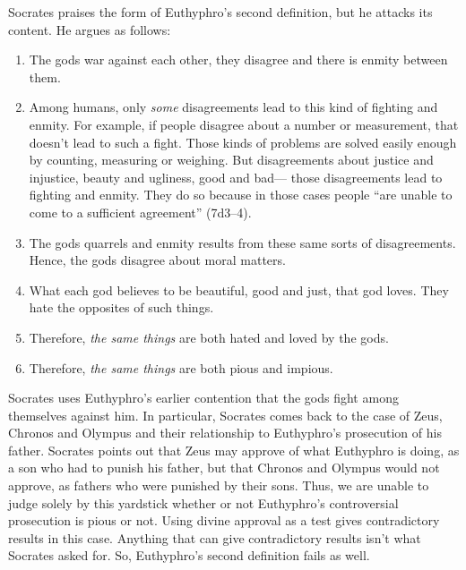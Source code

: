 \documentclass[11pt]{article}
\begin{document}
Socrates praises the form of Euthyphro's second definition, but he attacks
its content.  He argues as follows:

\begin{enumerate}

    \item The gods war against each other, they disagree and there is
        enmity between them.

    \item Among humans, only \emph{some} disagreements lead to this kind of
        fighting and enmity.  For example, if people disagree about
        a number or measurement, that doesn't lead to such a fight.  Those
        kinds of problems are solved easily enough by counting, measuring
        or weighing.  But disagreements about justice and injustice, beauty
        and ugliness, good and bad--- those disagreements lead to fighting
        and enmity.  They do so because in those cases people ``are unable
        to come to a sufficient agreement'' (7d3--4).

    \item The gods quarrels and enmity results from these same sorts of
        disagreements.  Hence, the gods disagree about moral matters.

    \item What each god believes to be beautiful, good and just, that god
        loves.  They hate the opposites of such things.

    \item Therefore, \emph{the same things} are both hated and loved by the
        gods.

    \item Therefore, \emph{the same things} are both pious and impious.

\end{enumerate}


Socrates uses Euthyphro's earlier contention that the gods fight among
themselves against him.  In particular, Socrates comes back to the case of
Zeus, Chronos and Olympus and their relationship to Euthyphro's prosecution
of his father.  Socrates points out that Zeus may approve of what Euthyphro
is doing, as a son who had to punish his father, but that Chronos and
Olympus would not approve, as fathers who were punished by their sons.
Thus, we are unable to judge solely by this yardstick whether or not
Euthyphro's controversial prosecution is pious or not.  Using divine
approval as a test gives contradictory results in this case.  Anything that
can give contradictory results isn't what Socrates asked for.  So,
Euthyphro's second definition fails as well.
\end{document}
